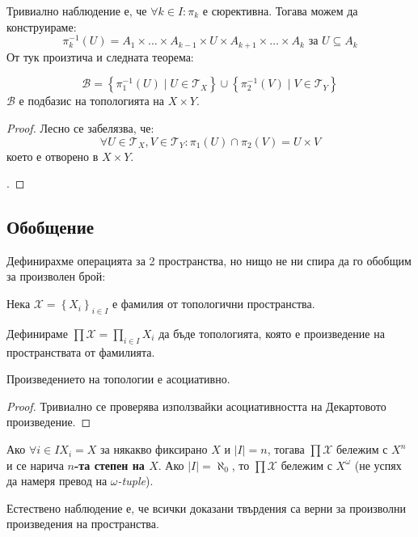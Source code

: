 Тривиално наблюдение е, че $\forall k \in I: \pi_k$ е сюрективна. Тогава можем да конструираме:
\begin{equation*}
    \pi_k^{-1}(U) = A_1 \times \dots \times A_{k-1} \times U \times A_{k+1} \times \dots \times A_k \text{ за } U \subseteq A_k
\end{equation*}
От тук произтича и следната теорема:
\begin{theorem}
    \begin{equation*}
        \mathcal B = \left\{ \pi_1^{-1}(U) \mid U \in \mathcal T_X \right\} \cup \left\{ \pi_2^{-1}(V) \mid V \in \mathcal T_Y \right\}
    \end{equation*}
    $\mathcal B$ е подбазис на топологията на $X \times Y$.
\end{theorem}
\begin{proof}
    Лесно се забелязва, че:
    \begin{equation*}
        \forall U \in \mathcal T_X, V\in \mathcal T_Y : \pi_1(U) \cap \pi_2(V) = U \times V
    \end{equation*}
    което е отворено в $X \times Y$.
    
    \cite[p.~88]{munkrestopology}.
\end{proof}

\subsection{Обобщение}
Дефинирахме операцията за 2 пространства, но нищо не ни спира да го обобщим за произволен брой:
\begin{definition}
    Нека $\mathcal X = \left\{X_i\right\}_{i \in I}$ е фамилия от топологични пространства.

    Дефинираме $\prod \mathcal X = \prod\limits_{i \in I}X_i$ да бъде топологията, която е произведение на пространствата от фамилията.
\end{definition}
\begin{proposition}
    Произведението на топологии е асоциативно.
\end{proposition}
\begin{proof}
    Тривиално се проверява използвайки асоциативността на Декартовото произведение.
\end{proof}
\begin{notation}
    Ако $\forall i \in I X_i = X$ за някакво фиксирано $X$ и $|I| = n$, тогава $\prod \mathcal X $ бележим с $X^n$ и се нарича \textbf{$n$-та степен на $X$}. Ако $|I| = \aleph_0$, то $\prod \mathcal X $ бележим с $X^\omega$ (не успях да намеря превод на \emph{$\omega$-tuple}).
\end{notation}
Естествено наблюдение е, че всички доказани твърдения са верни за произволни произведения на пространства.

